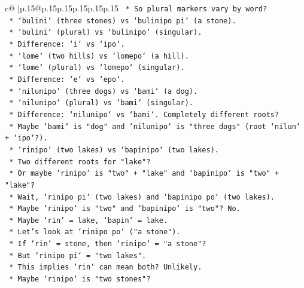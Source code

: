 \documentclass{article}
\begin{document}
{\begin{supertabular}{c@{$\;$}|p{.15\linewidth}@{}p{.15\linewidth}p{.15\linewidth}p{.15\linewidth}p{.15\linewidth}p{.15\linewidth}}
{{{\texttt{                *   So plural markers vary by word?} \\
\texttt{                *   `bulini` (three stones) vs `bulinipo pi` (a stone).} \\
\texttt{                    *   `bulini` (plural) vs `bulinipo` (singular).} \\
\texttt{                    *   Difference: `i` vs `ipo`.} \\
\texttt{                *   `lome` (two hills) vs `lomepo` (a hill).} \\
\texttt{                    *   `lome` (plural) vs `lomepo` (singular).} \\
\texttt{                    *   Difference: `e` vs `epo`.} \\
\texttt{                *   `nilunipo` (three dogs) vs `bami` (a dog).} \\
\texttt{                    *   `nilunipo` (plural) vs `bami` (singular).} \\
\texttt{                    *   Difference: `nilunipo` vs `bami`. Completely different roots?} \\
\texttt{                    *   Maybe `bami` is "dog" and `nilunipo` is "three dogs" (root `nilun` + `ipo`?).} \\
\texttt{                *   `rinipo` (two lakes) vs `bapinipo` (two lakes).} \\
\texttt{                    *   Two different roots for "lake"?} \\
\texttt{                    *   Or maybe `rinipo` is "two" + "lake" and `bapinipo` is "two" + "lake"?} \\
\texttt{                    *   Wait, `rinipo pi` (two lakes) and `bapinipo po` (two lakes).} \\
\texttt{                    *   Maybe `rinipo` is "two" and `bapinipo` is "two"? No.} \\
\texttt{                    *   Maybe `rin` = lake, `bapin` = lake.} \\
\texttt{                *   Let's look at `rinipo po` ("a stone").} \\
\texttt{                    *   If `rin` = stone, then `rinipo` = "a stone"?} \\
\texttt{                    *   But `rinipo pi` = "two lakes".} \\
\texttt{                    *   This implies `rin` can mean both? Unlikely.} \\
\texttt{                    *   Maybe `rinipo` is "two stones"?} \\
}}}
\end{supertabular}}
\end{document}
